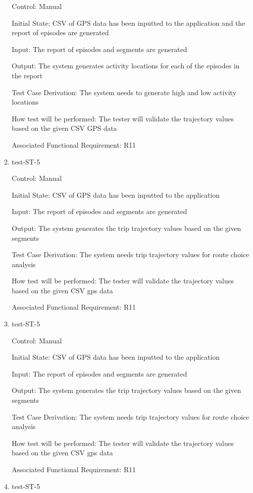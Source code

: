 \documentclass[12pt, titlepage]{article}
\begin{document}
\begin{enumerate}
Control: Manual
					
Initial State: CSV of GPS data has been inputted to the application and the report of episodes are generated
					
Input: The report of episodes and segments are generated
					
Output: The system generates activity locations for each of the episodes in the report

Test Case Derivation: The system needs to generate high and low activity locations

How test will be performed: The tester will validate the trajectory values based on the given CSV GPS data 

Associated Functional Requirement: R11

\item{test-ST-5\\}

Control: Manual
					
Initial State: CSV of GPS data has been inputted to the application 
					
Input: The report of episodes and segments are generated
					
Output: The system generates the trip trajectory values based on the given segments

Test Case Derivation: The system needs trip trajectory values for route choice analysis

How test will be performed: The tester will validate the trajectory values based on the given CSV gps data 

Associated Functional Requirement: R11
\item{test-ST-5\\}

Control: Manual
					
Initial State: CSV of GPS data has been inputted to the application 
					
Input: The report of episodes and segments are generated
					
Output: The system generates the trip trajectory values based on the given segments

Test Case Derivation: The system needs trip trajectory values for route choice analysis

How test will be performed: The tester will validate the trajectory values based on the given CSV gps data 

Associated Functional Requirement: R11

\item{test-ST-5\\}


\end{enumerate}
\end{document}
